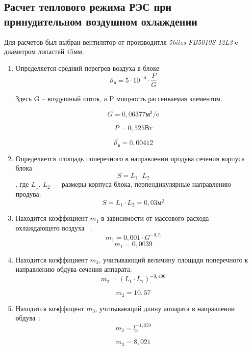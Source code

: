 \subsection{Расчет теплового режима РЭС при принудительном воздушном охлаждении}

Для расчетов был выбран вентилятор от производитля \textit{5bites}
\textit{FB5010S-12L3} c диаметром лопастей 45мм.

\begin{enumerate}[label={\arabic*.}]
\item Определяется средний перегрев воздуха в блоке
\begin{equation}
\vartheta\mathrm{_в} = 5 \cdot 10^{-4} \cdot \frac{P}{G}
\end{equation}

Здесь G – воздушный поток, а P мощность рассеиваемая элементом.

$$G = 0,06377\mathrm{м^3/c}$$

$$P = 0,525\mathrm{Вт}$$

$$\overline{\vartheta\mathrm{_в}} = 0,00412$$

\item Определяется площадь поперечного
  в направлении продува сечения корпуса блока $$S= L_1 \cdot L_2$$,
  где $L_1$, $L_2$ — размеры корпуса блока,
  перпендикулярные направлению продува.
  $$S= L_1 \cdot L_2 =0,03\mathrm{м^2}$$

\item Находится коэффициент $m_1$ в зависимости
  от массового расхода охлаждающего воздуха ~\cite{Rotkop1976}:
  \begin{equation}
    m_1 = 0,001 \cdot G^{-0,5}
    \end{equation}
  $$m_1 = 0,0039$$

\item Находится коэффициент $m_2$,
  учитывающий величину площади поперечного
  к направлению обдува сечения аппарата\cite{Rotkop1976}:
  \begin{equation}
    m_2= (L_1 \cdot L_2) ^ {-0,406}
    \end{equation}

    $$m_2 = 10,57$$

  \item Находится коэффицент $m_3$,
    учитывающий длину аппарата в направлении обдува~\cite{Rotkop1976}:
    \begin{equation}
      m_3 = l_3 ^ {-1,059}
      \end{equation}

      $$m_3 = 8,021$$


\end{enumerate}
